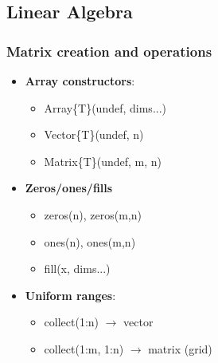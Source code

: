 \documentclass{report}
\begin{document}
    \pagebreak 
    \subsection{Linear Algebra}
    \bigbreak \noindent 
    \subsubsection{Matrix creation and operations}
    \begin{itemize}
        \item \textbf{Array constructors}:
            \begin{itemize}
                \item Array\{T\}(undef, dims...)
                \item Vector\{T\}(undef, n)
                \item Matrix\{T\}(undef, m, n)
            \end{itemize}
        \item \textbf{Zeros/ones/fills}
            \begin{itemize}
                \item zeros(n), zeros(m,n)
                \item ones(n), ones(m,n)
                \item fill(x, dims...)
            \end{itemize}
        \item \textbf{Uniform ranges}:
            \begin{itemize}
                \item collect(1:n) $\to$ vector
                \item collect(1:m, 1:n) $\to$ matrix (grid)
            \end{itemize}
    \end{itemize}



















    
\end{document}
